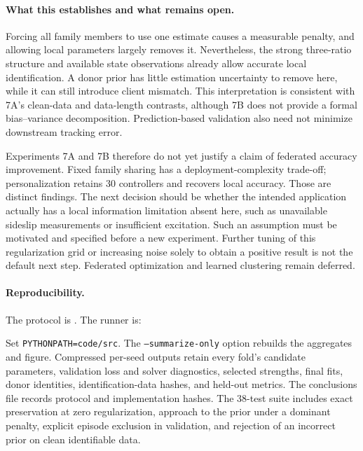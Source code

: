 \paragraph{What this establishes and what remains open.}
Forcing all family members to use one estimate causes a measurable penalty,
and allowing local parameters largely removes it. Nevertheless, the strong
three-ratio structure and available state observations already allow accurate
local identification. A donor prior has little estimation uncertainty to
remove here, while it can still introduce client mismatch. This interpretation
is consistent with 7A's clean-data and data-length contrasts, although 7B does
not provide a formal bias--variance decomposition. Prediction-based validation
also need not minimize downstream tracking error.

Experiments 7A and 7B therefore do not yet justify a claim of federated accuracy
improvement. Fixed family sharing has a deployment-complexity trade-off;
personalization retains 30 controllers and recovers local accuracy. Those are
distinct findings. The next decision should be whether the intended application
actually has a local information limitation absent here, such as unavailable
sideslip measurements or insufficient excitation. Such an assumption must be
motivated and specified before a new experiment. Further tuning of this
regularization grid or increasing noise solely to obtain a positive result
is not the default next step. Federated optimization and learned clustering
remain deferred.

\paragraph{Reproducibility.}
The protocol is . The runner is:
\begin{quote}\small
{}
\end{quote}
Set \texttt{PYTHONPATH=code/src}. The \texttt{--summarize-only} option rebuilds
the aggregates and figure. Compressed per-seed outputs retain every fold's
candidate parameters, validation loss and solver diagnostics, selected strengths,
final fits, donor identities, identification-data hashes, and held-out metrics.
The conclusions file records protocol and implementation hashes.
The 38-test suite includes exact preservation at zero regularization, approach
to the prior under a dominant penalty, explicit episode exclusion in validation,
and rejection of an incorrect prior on clean identifiable data.
